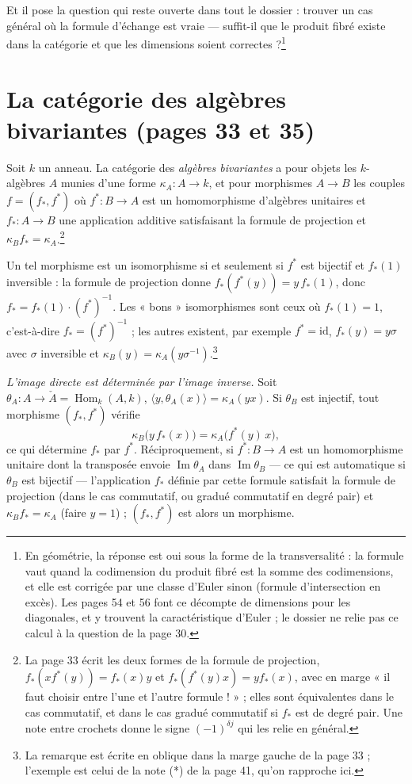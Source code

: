 \documentclass[11pt,a4paper]{article}
\begin{document}
Et il pose la question qui reste ouverte dans tout le dossier : trouver un cas
général où la formule d'échange est vraie --- suffit-il que le produit fibré
existe dans la catégorie et que les dimensions soient correctes ?\footnote{En
géométrie, la réponse est oui sous la forme de la transversalité : la formule
vaut quand la codimension du produit fibré est la somme des codimensions, et
elle est corrigée par une classe d'Euler sinon (formule d'intersection en
excès). Les pages 54 et 56 font ce décompte de dimensions pour les diagonales,
et y trouvent la caractéristique d'Euler ; le dossier ne relie pas ce calcul à
la question de la page 30.}

\section*{La catégorie des algèbres bivariantes (pages 33 et 35)}

Soit $k$ un anneau. La catégorie des \emph{algèbres bivariantes} a pour objets
les $k$-algèbres $A$ munies d'une forme $\kappa_{A} \colon A \to k$, et pour
morphismes $A \to B$ les couples $f = (f_{*}, f^{*})$ où
$f^{*} \colon B \to A$ est un homomorphisme d'algèbres unitaires et
$f_{*} \colon A \to B$ une application additive satisfaisant la formule de
projection et $\kappa_{B} f_{*} = \kappa_{A}$.\footnote{La page 33 écrit les
deux formes de la formule de projection, $f_{*}(x f^{*}(y)) = f_{*}(x) y$ et
$f_{*}(f^{*}(y) x) = y f_{*}(x)$, avec en marge « il faut choisir entre l'une et
l'autre formule ! » ; elles sont équivalentes dans le cas commutatif, et dans
le cas gradué commutatif si $f_{*}$ est de degré pair. Une note entre crochets
donne le signe $(-1)^{\delta j}$ qui les relie en général.}

Un tel morphisme est un isomorphisme si et seulement si $f^{*}$ est bijectif et
$f_{*}(1)$ inversible : la formule de projection donne
$f_{*}(f^{*}(y)) = y\, f_{*}(1)$, donc
$f_{*} = f_{*}(1) \cdot (f^{*})^{-1}$. Les « bons » isomorphismes sont ceux
où $f_{*}(1) = 1$, c'est-à-dire $f_{*} = (f^{*})^{-1}$ ; les autres existent,
par exemple $f^{*} = \mathrm{id}$, $f_{*}(y) = y\sigma$ avec $\sigma$ inversible
et $\kappa_{B}(y) = \kappa_{A}(y\sigma^{-1})$.\footnote{La remarque est écrite
en oblique dans la marge gauche de la page 33 ; l'exemple est celui de la
note (*) de la page 41, qu'on rapproche ici.}

\emph{L'image directe est déterminée par l'image inverse.} Soit
$\theta_{A} \colon A \to \check{A} = \operatorname{Hom}_{k}(A, k)$,
$\langle y, \theta_{A}(x) \rangle = \kappa_{A}(yx)$. Si $\theta_{B}$ est
injectif, tout morphisme $(f_{*}, f^{*})$ vérifie
\[ \kappa_{B}\bigl(y\, f_{*}(x)\bigr) = \kappa_{A}\bigl(f^{*}(y)\, x\bigr) , \]
ce qui détermine $f_{*}$ par $f^{*}$. Réciproquement, si
$f^{*} \colon B \to A$ est un homomorphisme unitaire dont la transposée envoie
$\operatorname{Im}\theta_{A}$ dans $\operatorname{Im}\theta_{B}$ --- ce qui
est automatique si $\theta_{B}$ est bijectif --- l'application $f_{*}$ définie
par cette formule satisfait la formule de projection (dans le cas commutatif,
ou gradué commutatif en degré pair) et $\kappa_{B} f_{*} = \kappa_{A}$ (faire
$y = 1$) ; $(f_{*}, f^{*})$ est alors un morphisme.
\end{document}
